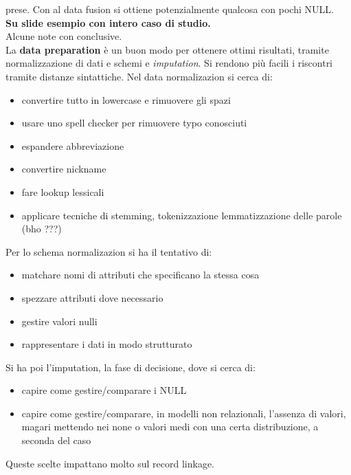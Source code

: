 \documentclass[a4paper,12pt, oneside]{book}
\begin{document}
prese. Con al data fusion si ottiene potenzialmente qualcosa con pochi NULL.\\
\textbf{Su slide esempio con intero caso di studio.}\\
Alcune note con conclusive.\\
La \textbf{data preparation} è un buon modo per ottenere ottimi risultati,
tramite normalizzazione di dati e schemi e \textit{imputation}. Si rendono più
facili i riscontri tramite distanze sintattiche. Nel data normalizazion si cerca
di:
\begin{itemize}
  \item convertire tutto in lowercase e rimuovere gli spazi
  \item usare uno spell checker per rimuovere typo conosciuti
  \item espandere abbreviazione
  \item convertire nickname
  \item fare lookup lessicali
  \item applicare tecniche di stemming, tokenizzazione lemmatizzazione delle
  parole (bho ???)
\end{itemize}
Per lo schema normalizazion si ha il tentativo di:
\begin{itemize}
  \item matchare nomi di attributi che specificano la stessa cosa
  \item spezzare attributi dove necessario
  \item gestire valori nulli
  \item rappresentare i dati in modo strutturato
\end{itemize}
Si ha poi l'imputation, la fase di decisione, dove si cerca di:
\begin{itemize}
  \item capire come gestire/comparare i NULL
  \item capire come gestire/comparare, in modelli non relazionali, l'assenza di
  valori, magari mettendo nei none o valori medi con una certa distribuzione, a
  seconda del caso
\end{itemize}
Queste scelte impattano molto sul record linkage.
\end{document}
